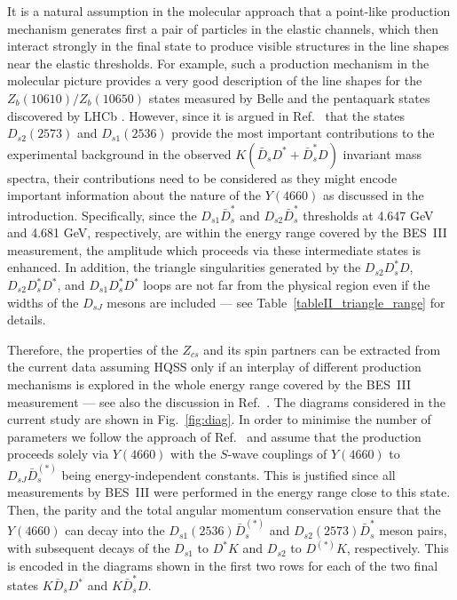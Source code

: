\documentclass[preprint,12pt,3p]{elsarticle}
\begin{document}
It is a natural assumption in the molecular approach that a point-like production mechanism generates first a pair of particles in the elastic channels, which then interact strongly in the final state to produce visible structures in the line shapes near the elastic thresholds. For example, such a production mechanism in the molecular picture provides a very good description of the line shapes for the $Z_b(10610)/Z_b(10650)$ states measured by Belle \cite{Wang:2018jlv,Baru:2019xnh,Baru:2020ywb} and the pentaquark states discovered by LHCb \cite{Du:2019pij,Du:2021fmf}. 
However, since it is argued in Ref.~\cite{BESIII:2020qkh} that the
states $D_{s2}(2573)$ and $D_{s1}(2536)$ provide the most important
contributions to the experimental background in the observed $K(\bar{D}_s
D^*+\bar{D}_s^* D)$ invariant mass spectra, their
contributions need to be considered as they might encode important information
about the nature of the $Y(4660)$ as discussed in the introduction.
Specifically, since the $D_{s1}\bar{D}_s^*$ and $D_{s2}\bar{D}_s^*$
thresholds at 4.647 GeV and 4.681 GeV, respectively, are within the
energy range covered by the BES~III measurement, the amplitude which
proceeds via these intermediate states is enhanced. In addition, the
triangle singularities generated by the $D_{s2}D_s^* D$, $D_{s2}D_s^*
D^*$, and $D_{s1}D_s^* D^*$ loops are not far from the physical region
even if the widths of the $D_{sJ}$ mesons are included --- see
Table~\ref{tableII_triangle_range} for details. 


Therefore, the properties of the $Z_{cs}$ and its spin partners can be extracted from the current data assuming HQSS only if 
an interplay of different production mechanisms is explored in the whole energy range covered by the BES~III measurement --- see also the discussion in Ref.~\cite{Du:2020vwb}. 
The diagrams considered in the current study are shown in Fig.~\ref{fig:diag}. 
In order to minimise the number of parameters we follow the approach
of Ref.~\cite{Yang:2020nrt} and assume that the production proceeds
solely via $Y(4660)$ with the $S$-wave couplings of $Y(4660)$ to
$D_{sJ} \bar{D}_s^{(*)}$ being energy-independent constants. This is
justified since all measurements by BES~III were performed in the
energy range close to this state. Then, the parity and the total angular momentum conservation ensure that the $Y(4660)$ can decay into the $D_{s1}(2536) \bar{D}_s^{(*)}$ and $ D_{s2}(2573) \bar{D}_s^*$ meson pairs, with subsequent decays of the $D_{s1}$ to $D^* K$ and $D_{s2}$ to $D^{(*)} K$, respectively. This is encoded in the diagrams shown in the first two rows for each of the two final states $K \bar{D}_sD^*$ and $K \bar{D}_s^* D$. 
\end{document}
